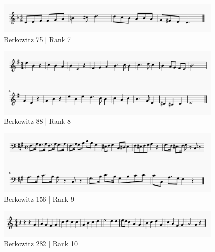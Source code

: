 \documentclass[]{book}
\begin{document}
\begin{figure}

{\centering \includegraphics[width=1\linewidth]{img/survey_melodies/Berkowitz75} 

}

\caption{Berkowitz 75 | Rank 7}\label{fig:berk75}
\end{figure}

\begin{figure}

{\centering \includegraphics[width=1\linewidth]{img/survey_melodies/Berkowitz88} 

}

\caption{Berkowitz 88 | Rank 8}\label{fig:berk88}
\end{figure}

\begin{figure}

{\centering \includegraphics[width=1\linewidth]{img/survey_melodies/Berkowitz156} 

}

\caption{Berkowitz 156 | Rank 9}\label{fig:berk156}
\end{figure}

\begin{figure}

{\centering \includegraphics[width=1\linewidth]{img/survey_melodies/Berkowitz282} 

}

\caption{Berkowitz 282 | Rank 10}\label{fig:berk282}
\end{figure}
\end{document}
